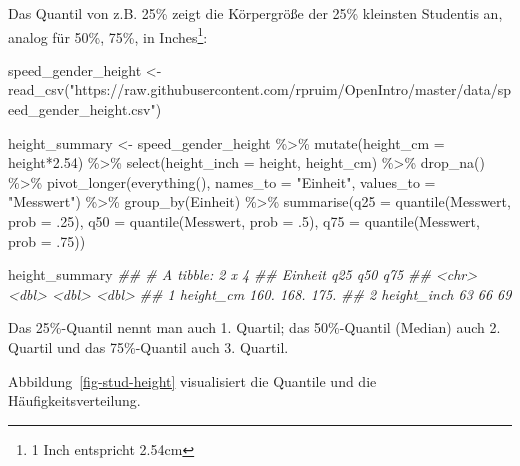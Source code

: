 \documentclass[
  a4paper,
  DIV=11]{scrreprt}
\newenvironment{Shaded}{\begin{snugshade}}{\end{snugshade}}
\newcommand{\AttributeTok}[1]{\textcolor[rgb]{0.40,0.45,0.13}{#1}}
\newcommand{\DecValTok}[1]{\textcolor[rgb]{0.68,0.00,0.00}{#1}}
\newcommand{\DocumentationTok}[1]{\textcolor[rgb]{0.37,0.37,0.37}{\textit{#1}}}
\newcommand{\FloatTok}[1]{\textcolor[rgb]{0.68,0.00,0.00}{#1}}
\newcommand{\FunctionTok}[1]{\textcolor[rgb]{0.28,0.35,0.67}{#1}}
\newcommand{\NormalTok}[1]{\textcolor[rgb]{0.00,0.23,0.31}{#1}}
\newcommand{\OtherTok}[1]{\textcolor[rgb]{0.00,0.23,0.31}{#1}}
\newcommand{\SpecialCharTok}[1]{\textcolor[rgb]{0.37,0.37,0.37}{#1}}
\newcommand{\StringTok}[1]{\textcolor[rgb]{0.13,0.47,0.30}{#1}}
\theoremstyle{definition}
\theoremstyle{remark}
\begin{document}
Das Quantil von z.B. 25\% zeigt die Körpergröße der 25\% kleinsten
Studentis an, analog für 50\%, 75\%, in Inches\footnote{1 Inch
  entspricht 2.54cm}:

\begin{Shaded}
\begin{Highlighting}[]
\NormalTok{speed\_gender\_height }\OtherTok{\textless{}{-}} \FunctionTok{read\_csv}\NormalTok{(}\StringTok{"https://raw.githubusercontent.com/rpruim/OpenIntro/master/data/speed\_gender\_height.csv"}\NormalTok{)}

\NormalTok{height\_summary }\OtherTok{\textless{}{-}} 
\NormalTok{  speed\_gender\_height }\SpecialCharTok{\%\textgreater{}\%} 
  \FunctionTok{mutate}\NormalTok{(}\AttributeTok{height\_cm =}\NormalTok{ height}\SpecialCharTok{*}\FloatTok{2.54}\NormalTok{) }\SpecialCharTok{\%\textgreater{}\%} 
  \FunctionTok{select}\NormalTok{(}\AttributeTok{height\_inch =}\NormalTok{ height, height\_cm) }\SpecialCharTok{\%\textgreater{}\%} 
  \FunctionTok{drop\_na}\NormalTok{() }\SpecialCharTok{\%\textgreater{}\%} 
  \FunctionTok{pivot\_longer}\NormalTok{(}\FunctionTok{everything}\NormalTok{(), }\AttributeTok{names\_to =} \StringTok{"Einheit"}\NormalTok{, }\AttributeTok{values\_to =} \StringTok{"Messwert"}\NormalTok{) }\SpecialCharTok{\%\textgreater{}\%} 
  \FunctionTok{group\_by}\NormalTok{(Einheit) }\SpecialCharTok{\%\textgreater{}\%} 
  \FunctionTok{summarise}\NormalTok{(}\AttributeTok{q25 =} \FunctionTok{quantile}\NormalTok{(Messwert, }\AttributeTok{prob =}\NormalTok{ .}\DecValTok{25}\NormalTok{),}
            \AttributeTok{q50 =} \FunctionTok{quantile}\NormalTok{(Messwert, }\AttributeTok{prob =}\NormalTok{ .}\DecValTok{5}\NormalTok{),}
            \AttributeTok{q75 =} \FunctionTok{quantile}\NormalTok{(Messwert, }\AttributeTok{prob =}\NormalTok{ .}\DecValTok{75}\NormalTok{))}

\NormalTok{height\_summary}
\DocumentationTok{\#\# \# A tibble: 2 x 4}
\DocumentationTok{\#\#   Einheit       q25   q50   q75}
\DocumentationTok{\#\#   \textless{}chr\textgreater{}       \textless{}dbl\textgreater{} \textless{}dbl\textgreater{} \textless{}dbl\textgreater{}}
\DocumentationTok{\#\# 1 height\_cm    160.  168.  175.}
\DocumentationTok{\#\# 2 height\_inch   63    66    69}
\end{Highlighting}
\end{Shaded}

Das 25\%-Quantil nennt man auch 1. Quartil; das 50\%-Quantil (Median)
auch 2. Quartil und das 75\%-Quantil auch 3. Quartil.

Abbildung~\ref{fig-stud-height} visualisiert die Quantile und die
Häufigkeitsverteilung.
\end{document}
